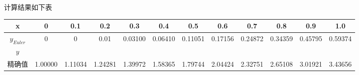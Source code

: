 \documentclass[a4paper, 10pt]{article}
\begin{document}
\begin{CJK}{UTF8}{gbsn}
计算结果如下表
\begin{table}[h]
	\begin{tabular}{c|c c c c c c c c c c c}
		\hline
		x           & 0 & 0.1 & 0.2 & 0.3 & 0.4 & 0.5 & 0.6 & 0.7 & 0.8 & 0.9 & 1.0 \\
		\hline
		$y_{Euler}$ & 0 & 0 & 0.01 & 0.03100 & 0.06410 & 0.11051 & 0.17156 & 0.24872 & 0.34359 & 0.45795 & 0.59374 \\
		$y_{}$      \\
		\hline
		精确值       & 1.00000 & 1.11034 & 1.24281 & 1.39972 & 1.58365 & 1.79744 & 2.04424 & 2.32751 & 2.65108 & 3.01921 & 3.43656 \\
		\hline
	\end{tabular}
\end{table}

\end{CJK}
\end{document}

